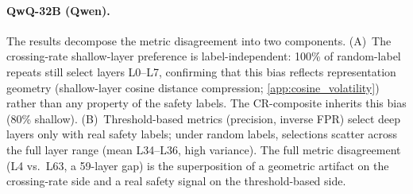 \begin{table}[htbp]
\centering
\small
\caption{QwQ-32B layer selection under random CP labels (10 repeats). Shallow\%: fraction selecting a layer L$\leq$10. Real-CP layer shown for reference.}
\label{tab:random_cp}
\setlength{\tabcolsep}{4pt}
\end{table}

\begin{table}[htbp]
\centering
\small
\caption{R1-8B layer selection under random CP labels (10 repeats). Shallow\%: fraction selecting L$\leq$4 (bottom quintile of 25 layers). $\dagger$: degenerate, all repeats select L0 with zero variance, indicating destroyed signal rather than shallow preference.}
\label{tab:random_cp_r18b}
\setlength{\tabcolsep}{4pt}
\end{table}

\paragraph{QwQ-32B (Qwen).} The results decompose the metric disagreement into two components. (A)~The crossing-rate shallow-layer preference is label-independent: 100\% of random-label repeats still select layers L0--L7, confirming that this bias reflects representation geometry (shallow-layer cosine distance compression; \cref{app:cosine_volatility}) rather than any property of the safety labels. The CR-composite inherits this bias (80\% shallow). (B)~Threshold-based metrics (precision, inverse FPR) select deep layers only with real safety labels; under random labels, selections scatter across the full layer range (mean L34--L36, high variance). The full metric disagreement (L4 vs.\ L63, a 59-layer gap) is the superposition of a geometric artifact on the crossing-rate side and a real safety signal on the threshold-based side.

